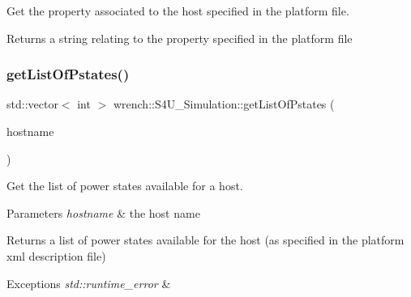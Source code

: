 Get the property associated to the host specified in the platform file. 

\begin{DoxyReturn}{Returns}
a string relating to the property specified in the platform file 
\end{DoxyReturn}
\mbox{\label{classwrench_1_1_s4_u___simulation_a9b077f7a49a17ff009891dce42910b48}} 
\subsubsection{\texorpdfstring{get\+List\+Of\+Pstates()}{getListOfPstates()}}
{\footnotesize\ttfamily std\+::vector$<$ int $>$ wrench\+::\+S4\+U\+\_\+\+Simulation\+::get\+List\+Of\+Pstates (\begin{DoxyParamCaption}\item[{const std\+::string \&}]{hostname }\end{DoxyParamCaption})\hspace{0.3cm}{\ttfamily [static]}}



Get the list of power states available for a host. 


\begin{DoxyParams}{Parameters}
{\em hostname} & the host name \\
\hline
\end{DoxyParams}
\begin{DoxyReturn}{Returns}
a list of power states available for the host (as specified in the platform xml description file) 
\end{DoxyReturn}

\begin{DoxyExceptions}{Exceptions}
{\em std\+::runtime\+\_\+error} & \\
\hline
\end{DoxyExceptions}
\mbox{\label{classwrench_1_1_s4_u___simulation_a386ca90dcf205eb01fd145f837dbe153}} 
